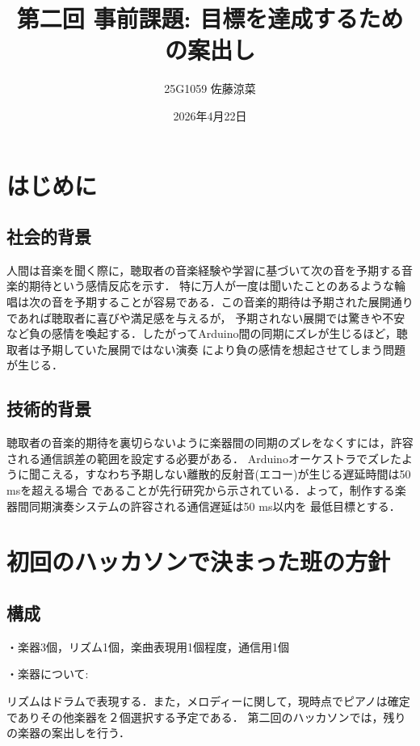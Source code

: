 \documentclass[uplatex,dvipdfmx]{jlreq}
\begin{document}
\title{第二回 事前課題: 目標を達成するための案出し}
\author{25G1059 佐藤涼菜}
\date{2026年4月22日}
\maketitle




\section{はじめに}

\subsection{社会的背景}
人間は音楽を聞く際に，聴取者の音楽経験や学習に基づいて次の音を予期する音楽的期待という感情反応を示す．
特に万人が一度は聞いたことのあるような輪唱は次の音を予期することが容易である．この音楽的期待は予期された展開通りであれば聴取者に喜びや満足感を与えるが，
予期されない展開では驚きや不安など負の感情を喚起する\cite{ref:kitai}．したがってArduino間の同期にズレが生じるほど，聴取者は予期していた展開ではない演奏
により負の感情を想起させてしまう問題が生じる．

\subsection{技術的背景}
聴取者の音楽的期待を裏切らないように楽器間の同期のズレをなくすには，許容される通信誤差の範囲を設定する必要がある．
Arduinoオーケストラでズレたように聞こえる，すなわち予期しない離散的反射音(エコー)が生じる遅延時間は50 msを超える場合
であることが先行研究から示されている\cite{ref:eko}．よって，制作する楽器間同期演奏システムの許容される通信遅延は50 ms以内を
最低目標とする．




\section{初回のハッカソンで決まった班の方針}

\subsection{構成}
・楽器3個，リズム1個，楽曲表現用1個程度，通信用1個\par
・楽器について:\par
リズムはドラムで表現する．また，メロディーに関して，現時点でピアノは確定でありその他楽器を２個選択する予定である．
第二回のハッカソンでは，残りの楽器の案出しを行う．
\end{document}
